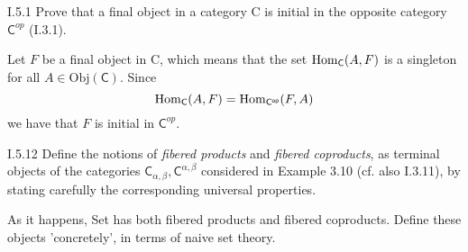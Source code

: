 \section{}

\begin{problem}{I.5.1}
Prove that a final object in a category \textsf{C} is initial in the opposite category $\mathsf{C}^{op}$ (I.3.1).	
\end{problem}
\begin{pf}
Let $F$ be a final object in \textsf{C}, which means that the set $\operatorname{Hom}_\mathsf{C}(A, F)$ is a singleton for all $A \in \text{Obj}(\mathsf{C})$. Since
\[
\operatorname{Hom}_\mathsf{C}(A, F) = \operatorname{Hom}_\mathsf{C^{op}}(F, A)
\]
we have that $F$ is initial in $\mathsf{C}^{op}$.
\end{pf}


\begin{problem}{I.5.12}
Define the notions of \emph{fibered products} and \emph{fibered coproducts}, as terminal objects of the categories $\mathsf{C}_{\alpha, \beta}, \mathsf{C}^{\alpha, \beta}$ considered in Example 3.10 (cf. also I.3.11), by stating carefully the corresponding universal properties. 

As it happens, \textsf{Set} has both fibered products and fibered coproducts. Define these objects 'concretely', in terms of naive set theory.
\end{problem}
